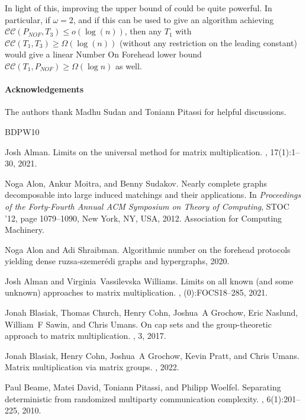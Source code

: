 \documentclass[10pt,a4paper]{article}
\newcommand{\cc}{\mathcal{CC}}
\begin{document}
In light of this, improving the upper bound of  could be quite powerful. In particular, if $\omega = 2$, and if this can be used to give an algorithm achieving $\cc(P_{NOF}, T_3) \leq o(\log(n))$, then any $T_1$ with $\cc(T_1, T_3) \geq \Omega(\log (n))$ (without any restriction on the leading constant) would give a linear Number On Forehead lower bound $\cc(T_1, P_{NOF}) \geq \Omega( \log n)$ as well.

\paragraph{Acknowledgements}
The authors thank Madhu Sudan and Toniann Pitassi for helpful discussions.

\newcommand{\etalchar}[1]{$^{#1}$}
\begin{thebibliography}{BDPW10}

Josh Alman.
\newblock Limits on the universal method for matrix multiplication.
, 17(1):1--30, 2021.

Noga Alon, Ankur Moitra, and Benny Sudakov.
\newblock Nearly complete graphs decomposable into large induced matchings and
  their applications.
\newblock In {\em Proceedings of the Forty-Fourth Annual ACM Symposium on
  Theory of Computing}, STOC '12, page 1079–1090, New York, NY, USA, 2012.
  Association for Computing Machinery.

Noga Alon and Adi Shraibman.
\newblock Algorithmic number on the forehead protocols yielding dense
  ruzsa-szemerédi graphs and hypergraphs, 2020.

Josh Alman and Virginia~Vassilevska Williams.
\newblock Limits on all known (and some unknown) approaches to matrix
  multiplication.
, (0):FOCS18--285, 2021.

\bibitem[BCC{\etalchar{+}}17]{BCHGNSU17}
Jonah Blasiak, Thomas Church, Henry Cohn, Joshua~A Grochow, Eric Naslund,
  William~F Sawin, and Chris Umans.
\newblock On cap sets and the group-theoretic approach to matrix
  multiplication.
, 3, 2017.

\bibitem[BCG{\etalchar{+}}22]{BCGPU22}
Jonah Blasiak, Henry Cohn, Joshua~A Grochow, Kevin Pratt, and Chris Umans.
\newblock Matrix multiplication via matrix groups.
, 2022.

Paul Beame, Matei David, Toniann Pitassi, and Philipp Woelfel.
\newblock Separating deterministic from randomized multiparty communication
  complexity.
, 6(1):201--225, 2010.


\end{thebibliography}
\end{document}
